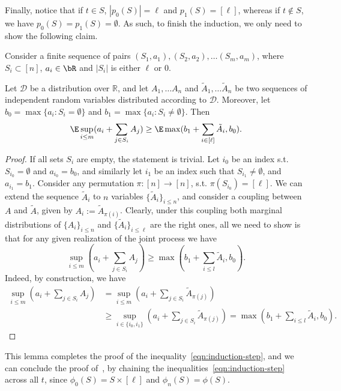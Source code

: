 Finally, notice that if $t \in S$, $|p_0(S)| = \ell$ and $p_1(S) = [\ell]$, whereas if $t \not\in S$, we have $p_0(S) = p_1(S) = \emptyset$. As such, to finish the induction, we only need to show the following claim.
\begin{claim}
    Consider a finite sequence of pairs $(S_1, a_1), (S_2, a_2), \ldots (S_m, a_m)$, where $S_i \subset [n]$, $a_i \in \bR$ and $|S_i|$ is either $\ell$ or $0$.

    Let $\mathcal{D}$ be a distribution over $\mathbb{R}$, and let $A_1, \ldots A_n$ and $\tilde{A}_1, \ldots \tilde{A}_n$ be two sequences of independent random variables distributed according to $\mathcal{D}$. Moreover, let $b_0 = \max \{ a_i : S_i = \emptyset \}$ and $b_1 = \max \{a_i : S_i \not= \emptyset\}$. Then
    \begin{equation*}
        \E \sup_{i \leq m}(a_i + \sum_{j \in S_i} A_j) \geq \E \max(b_1 + \sum_{i \in [\ell]} \tilde{A}_i, b_0).
    \end{equation*}
\end{claim}
\begin{proof}
If all sets $S_i$ are empty, the statement is trivial. Let $i_0$ be an index s.t. $S_{i_0} = \emptyset$ and $a_{i_0} = b_0$, and similarly let $i_1$ be an index such that $S_{i_1} \not= \emptyset$, and $a_{i_1} = b_1$. Consider any permutation $\pi : [n] \to [n]$, s.t. $\pi(S_{i_0}) = [\ell]$. We can extend the sequence $\tilde{A}_i$ to $n$ variables $\{\tilde{A}_{i}\}_{i \leq n}$, and consider a coupling between $A$ and $\tilde{A}$, given by $A_{i} := \tilde{A}_{\pi(i)}$. Clearly, under this coupling both marginal distributions of $\{A_i\}_{i \leq n}$ and $\{\tilde{A}_i\}_{i \leq \ell}$ are the right ones, all we need to show is that for any given realization of the joint process we have
\begin{equation*}
    \sup_{i\leq m} (a_i + \sum_{j \in S_i} A_j) \geq \max(b_1 + \sum_{i \leq l} \tilde{A}_i, b_0).
\end{equation*}
Indeed, by construction, we have
\begin{align*}
    \sup_{i\leq m} (a_i + \sum_{j \in S_i} A_j) & = \sup_{i \leq m} (a_i + \sum_{j \in S_i} \tilde{A}_{\pi(j)}) \\
    & \geq \sup_{i \in \{i_0, i_1\} } (a_i + \sum_{j \in S_i} \tilde{A}_{\pi(j)}) = \max(b_1 + \sum_{i \leq l} \tilde{A}_i, b_0).
\end{align*}
\end{proof}
This lemma completes the proof of the inequality~\eqref{eqn:induction-step}, and we can conclude the proof of~, by chaining the inequalities~\eqref{eqn:induction-step} across all $t$, since $\phi_0(S) = S \times [\ell]$ and $\phi_n(S) = \phi(S)$.
